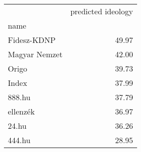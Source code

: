\begin{tabular}{lr}
\toprule
{} &  predicted ideology \\
name          &                     \\
\midrule
Fidesz-KDNP   &               49.97 \\
Magyar Nemzet &               42.00 \\
Origo         &               39.73 \\
Index         &               37.99 \\
888.hu        &               37.79 \\
ellenzék      &               36.97 \\
24.hu         &               36.26 \\
444.hu        &               28.95 \\
\bottomrule
\end{tabular}
